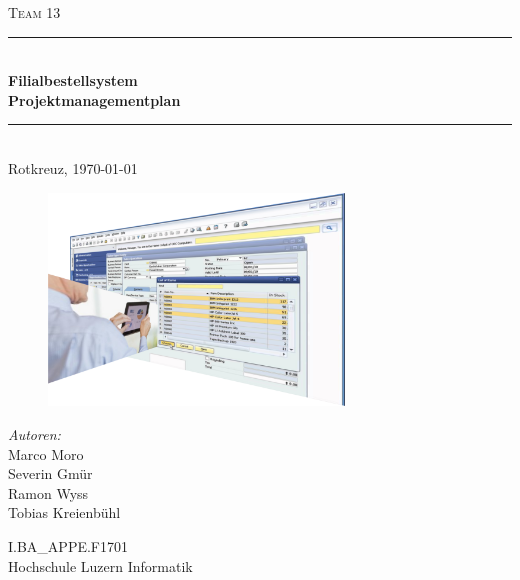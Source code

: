 \begin{titlepage}   

\begin{center}
\textsc{\Large Team 13}\\[0.5cm]

\newcommand{\HRule}{\rule{\linewidth}{0.5mm}}
\HRule \\[0.4cm]
{ \huge \bfseries Filialbestellsystem}\\[0.4cm]
{ \LARGE \bfseries Projektmanagementplan}\\[0.4cm]
\HRule \\[1.5cm]

{\large Rotkreuz, \today}

\begin{figure}[H]%
\centering
\includegraphics[width=0.7\textwidth]{Images/Titelbild.png}
\label{fig:title}
\end{figure}
\begin{minipage}{0.4\textwidth}
\begin{flushleft} \large
\emph{Autoren:}\\
Marco Moro\\
Severin Gmür\\
Ramon Wyss\\
Tobias Kreienbühl\\
\end{flushleft}
\end{minipage}
\hfill
\begin{minipage}{0.4\textwidth}
\begin{flushright} \large
\end{flushright}
\end{minipage}
\large
\vfill
I.BA\_APPE.F1701 \\
Hochschule Luzern Informatik

\end{center}

\end{titlepage}